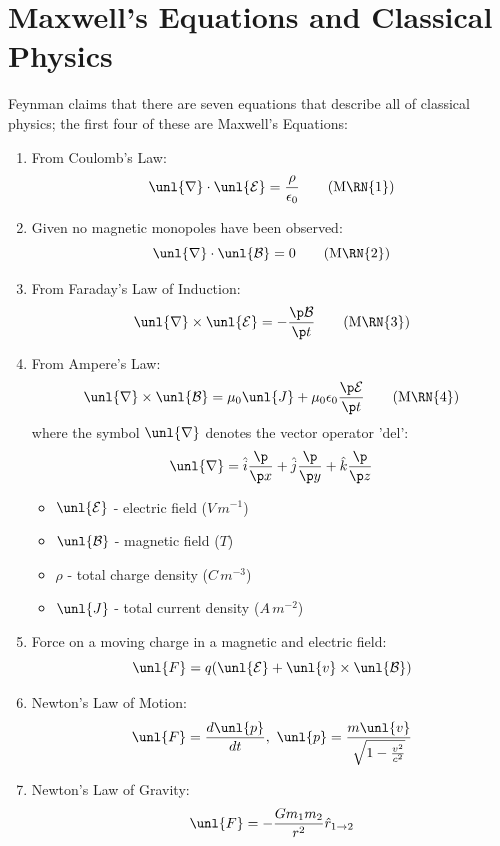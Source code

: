 \documentclass[a4paper, 11pt, normalem]{report}
\renewcommand\E{\mathcal{E}}
\newcommand\uE{\unl{\E}}
\renewcommand\B{\mathcal{B}}
\newcommand\uB{\unl{\B}}
\renewcommand\del{\unl{\nabla}}
\newcommand\eno{\epsilon_0}
\newcommand\hi{\hat{i}}
\newcommand\hj{\hat{j}}
\newcommand\hk{\hat{k}}
\newcommand\J{\unl{J}}
\begin{document}
\section{Maxwell's Equations and Classical Physics}
Feynman claims that there are seven equations that describe all of classical physics; the first four of these are Maxwell's Equations:
\begin{enumerate}
    \item From Coulomb's Law:
        \begin{equation}
            \del\cdot\uE = \frac{\rho}{\eno} \tag{M\RN{1}}
        \end{equation}
    \item Given no magnetic monopoles have been observed:
        \begin{equation}
            \del\cdot \uB = 0 \tag{M\RN{2}}
        \end{equation}
    \item From Faraday's Law of Induction:
        \begin{equation}
            \del \times \uE = -\frac{\p \B}{\p t} \tag{M\RN{3}}
        \end{equation}
    \item From Ampere's Law:
        \begin{equation}
            \del \times \uB = \mu_0 \J + \mu_0 \eno \frac{\p \E}{\p t} \tag{M\RN{4}}
        \end{equation}
        where the symbol $\del$ denotes the vector operator 'del':
        \begin{equation}
            \del = \hi \frac{\p}{\p x} + \hj \frac{\p}{\p y} + \hk \frac{\p}{\p z}
        \end{equation}
        \begin{itemize}
            \item $\uE$ - electric field ($V\,m^{-1}$)
            \item $\uB$ - magnetic field ($T$)
            \item $\rho$ - total charge density ($C\,m^{-3}$)
            \item $\J$ - total current density ($A\,m^{-2}$)
        \end{itemize}
    \item Force on a moving charge in a magnetic and electric field:
        \begin{equation}
            \unl{F} = q(\uE + \unl{v} \times \uB)
        \end{equation}
    \item Newton's Law of Motion:
        \begin{equation}
            \unl{F} = \frac{d\unl{p}}{dt}, ~ \unl{p} = \frac{m\unl{v}}{\sqrt{1 - \frac{v^2}{c^2}}}
        \end{equation}
    \item Newton's Law of Gravity:
        \begin{equation}
            \unl{F} = -\frac{Gm_1 m_2}{r^2}\hat{r}_{1 \to 2}
        \end{equation}
\end{enumerate}
\end{document}
